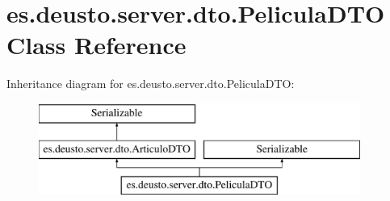 \hypertarget{classes_1_1deusto_1_1server_1_1dto_1_1_pelicula_d_t_o}{}\section{es.\+deusto.\+server.\+dto.\+Pelicula\+D\+TO Class Reference}
\label{classes_1_1deusto_1_1server_1_1dto_1_1_pelicula_d_t_o}
Inheritance diagram for es.\+deusto.\+server.\+dto.\+Pelicula\+D\+TO\+:\begin{figure}[H]
\begin{center}
\leavevmode
\includegraphics[height=3.000000cm]{classes_1_1deusto_1_1server_1_1dto_1_1_pelicula_d_t_o}
\end{center}
\end{figure}
